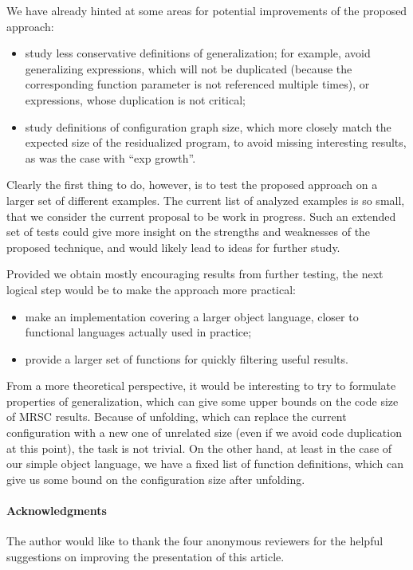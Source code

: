 \documentclass[submission,copyright,creativecommons]{eptcs}
\begin{document}
We have already hinted at some areas for potential improvements of the proposed approach:
\begin{itemize}
  \item study less conservative definitions of generalization; for example, avoid generalizing
    expressions, which will not be duplicated (because the corresponding function parameter is
    not referenced multiple times), or expressions, whose duplication is not critical;
  \item study definitions of configuration graph size, which more closely match the expected
    size of the residualized program, to avoid missing interesting results, as was the case
    with ``exp growth''.
\end{itemize}
Clearly the first thing to do, however, is to test the proposed approach on a larger set of
different examples.
The current list of analyzed examples is so small, that we consider the current proposal
to be work in progress.
Such an extended set of tests could give more insight on the strengths and weaknesses of the 
proposed technique, and would likely lead to ideas for further study.

Provided we obtain mostly encouraging results from further testing, the next logical 
step would be to make the approach more practical:
\begin{itemize}
  \item make an implementation covering a larger object language, closer to functional languages
    actually used in practice;
  \item provide a larger set of functions for quickly filtering useful results.
\end{itemize}

From a more theoretical perspective, it would be interesting to try to formulate properties
of generalization, which can give some upper bounds on the code size of MRSC results.
Because of unfolding, which can replace the current configuration with a new one of unrelated size (even
if we avoid code duplication at this point), the task is not trivial.
On the other hand, at least in the case of our simple object language, we have a fixed
list of function definitions, which can give us some bound on the configuration size
after unfolding.

\paragraph{Acknowledgments}
The author would like to thank the four anonymous reviewers for
the helpful suggestions on improving the presentation of
this article.
\end{document}
